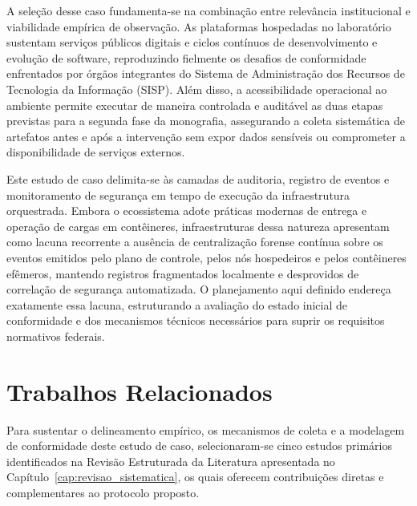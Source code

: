 A seleção desse caso fundamenta-se na combinação entre relevância institucional e viabilidade empírica de observação. As plataformas hospedadas no laboratório sustentam serviços públicos digitais e ciclos contínuos de desenvolvimento e evolução de software, reproduzindo fielmente os desafios de conformidade enfrentados por órgãos integrantes do Sistema de Administração dos Recursos de Tecnologia da Informação (SISP). Além disso, a acessibilidade operacional ao ambiente permite executar de maneira controlada e auditável as duas etapas previstas para a segunda fase da monografia, assegurando a coleta sistemática de artefatos antes e após a intervenção sem expor dados sensíveis ou comprometer a disponibilidade de serviços externos.

Este estudo de caso delimita-se às camadas de auditoria, registro de eventos e monitoramento de segurança em tempo de execução da infraestrutura orquestrada. Embora o ecossistema adote práticas modernas de entrega e operação de cargas em contêineres, infraestruturas dessa natureza apresentam como lacuna recorrente a ausência de centralização forense contínua sobre os eventos emitidos pelo plano de controle, pelos nós hospedeiros e pelos contêineres efêmeros, mantendo registros fragmentados localmente e desprovidos de correlação de segurança automatizada. O planejamento aqui definido endereça exatamente essa lacuna, estruturando a avaliação do estado inicial de conformidade e dos mecanismos técnicos necessários para suprir os requisitos normativos federais.


\section{Trabalhos Relacionados}
\label{sec:ec_trabalhos_relacionados}

Para sustentar o delineamento empírico, os mecanismos de coleta e a modelagem de conformidade deste estudo de caso, selecionaram-se cinco estudos primários identificados na Revisão Estruturada da Literatura apresentada no Capítulo~\ref{cap:revisao_sistematica}, os quais oferecem contribuições diretas e complementares ao protocolo proposto.

